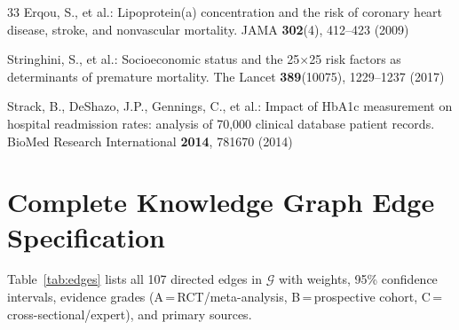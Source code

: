 \documentclass[runningheads]{llncs}
\begin{document}
\begin{thebibliography}{33}
Erqou, S., et al.:
Lipoprotein(a) concentration and the risk of coronary heart disease,
stroke, and nonvascular mortality.
JAMA \textbf{302}(4), 412--423 (2009)

Stringhini, S., et al.:
Socioeconomic status and the 25$\times$25 risk factors as
determinants of premature mortality.
The Lancet \textbf{389}(10075), 1229--1237 (2017)

Strack, B., DeShazo, J.P., Gennings, C., et al.:
Impact of HbA1c measurement on hospital readmission rates:
analysis of 70,000 clinical database patient records.
BioMed Research International \textbf{2014}, 781670 (2014)

\end{thebibliography}

\clearpage
\appendix
\section{Complete Knowledge Graph Edge Specification}\label{app:edges}

Table~\ref{tab:edges} lists all 107 directed edges in $\mathcal{G}$
with weights, 95\% confidence intervals, evidence grades (A\,=\,RCT/meta-analysis,
B\,=\,prospective cohort, C\,=\,cross-sectional/expert), and primary sources.
\end{document}

